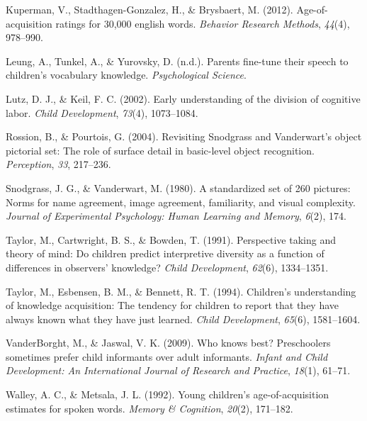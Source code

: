 \documentclass[10pt, letterpaper]{article}
\begin{document}
\leavevmode\hypertarget{ref-kuperman2012}{}%
Kuperman, V., Stadthagen-Gonzalez, H., \& Brysbaert, M. (2012).
Age-of-acquisition ratings for 30,000 english words. \emph{Behavior
Research Methods}, \emph{44}(4), 978--990.

\leavevmode\hypertarget{ref-leung2021}{}%
Leung, A., Tunkel, A., \& Yurovsky, D. (n.d.). Parents fine-tune their
speech to children's vocabulary knowledge. \emph{Psychological Science}.

\leavevmode\hypertarget{ref-lutz2002}{}%
Lutz, D. J., \& Keil, F. C. (2002). Early understanding of the division
of cognitive labor. \emph{Child Development}, \emph{73}(4), 1073--1084.

\leavevmode\hypertarget{ref-rossion2004}{}%
Rossion, B., \& Pourtois, G. (2004). Revisiting Snodgrass and
Vanderwart's object pictorial set: The role of surface detail in
basic-level object recognition. \emph{Perception}, \emph{33}, 217--236.

\leavevmode\hypertarget{ref-snodgrass1980}{}%
Snodgrass, J. G., \& Vanderwart, M. (1980). A standardized set of 260
pictures: Norms for name agreement, image agreement, familiarity, and
visual complexity. \emph{Journal of Experimental Psychology: Human
Learning and Memory}, \emph{6}(2), 174.

\leavevmode\hypertarget{ref-taylor1991}{}%
Taylor, M., Cartwright, B. S., \& Bowden, T. (1991). Perspective taking
and theory of mind: Do children predict interpretive diversity as a
function of differences in observers' knowledge? \emph{Child
Development}, \emph{62}(6), 1334--1351.

\leavevmode\hypertarget{ref-taylor1994}{}%
Taylor, M., Esbensen, B. M., \& Bennett, R. T. (1994). Children's
understanding of knowledge acquisition: The tendency for children to
report that they have always known what they have just learned.
\emph{Child Development}, \emph{65}(6), 1581--1604.

\leavevmode\hypertarget{ref-vanderborght2009}{}%
VanderBorght, M., \& Jaswal, V. K. (2009). Who knows best? Preschoolers
sometimes prefer child informants over adult informants. \emph{Infant
and Child Development: An International Journal of Research and
Practice}, \emph{18}(1), 61--71.

\leavevmode\hypertarget{ref-walley1992}{}%
Walley, A. C., \& Metsala, J. L. (1992). Young children's
age-of-acquisition estimates for spoken words. \emph{Memory \&
Cognition}, \emph{20}(2), 171--182.


\end{document}
